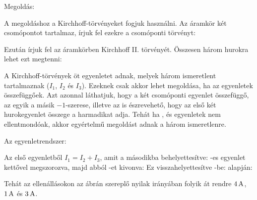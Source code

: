 
\ifdefined\megoldas
 
 Megoldás: 

 A megoldáshoz a Kirchhoff-törvényeket fogjuk használni. Az áramkör két csomópontot tartalmaz, írjuk fel ezekre a csomóponti törvényt:

 Ezután írjuk fel az áramkörben Kirchhoff II. törvényét. Összesen három hurokra lehet ezt megtenni:

 A Kirchhoff-törvények öt egyenletet adnak, melyek három ismeretlent tartalmaznak ($I_1$, $I_2$ és $I_3$). Ezeknek csak akkor lehet megoldása, ha az egyenletek összefüggőek. Azt azonnal láthatjuk, hogy a két csomóponti egyenlet összefüggő, az egyik a másik $-1$-szerese, illetve az is észrevehető, hogy az első két hurokegyenlet összege a harmadikat adja. Tehát ha ,  és  egyenletek nem ellentmondóak, akkor egyértelmű megoldást adnak a három ismeretlenre.

 Az egyenletrendszer:

 Az első egyenletből $I_1=I_2+I_3$, amit a másodikba behelyettesítve:
 -es egyenlet kettővel megszorozva, majd abból -et kivonva:
 Ez visszahelyettesítve -be:
  alapján:

 Tehát az ellenállásokon az ábrán szereplő nyilak irányában folyik át rendre $4\mathrm{\, A}$, $1\mathrm{\, A}$ és $3\mathrm{\, A}$.

\fi